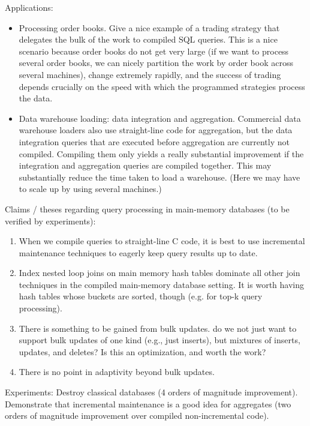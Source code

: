 \documentclass[10pt,twocolumn]{article}
\begin{document}
Applications:
\begin{itemize}
\item
Processing order books. Give a nice example of a trading strategy that
delegates the bulk of the work to compiled SQL queries.
This is a nice scenario because order books do not get very large (if we
want to process several order books, we can nicely partition the work by
order book across several machines), change extremely rapidly, and the
success of trading depends crucially on the speed with which the programmed
strategies process the data.

\item
Data warehouse loading: data integration and aggregation.
Commercial data warehouse loaders also use straight-line code for aggregation,
but the data integration queries that are executed before aggregation are currently not compiled. Compiling them only yields a really substantial improvement
if the integration and aggregation queries are compiled together. This may substantially reduce the time taken to load a warehouse. (Here we may have to scale up by using several machines.)
\end{itemize}

Claims / theses regarding query processing in main-memory databases (to be verified by experiments):
\begin{enumerate}
\item
When we compile queries to straight-line C code, it is best to use incremental
maintenance techniques to eagerly keep query results up to date.

\item
Index nested loop joins on main memory hash tables
dominate all other join techniques in the compiled
main-memory database setting.
It is worth having hash tables whose buckets are sorted, though (e.g. for
top-k query processing).

\item
There is something to be gained from bulk updates.
do we not just want to support bulk updates of one kind (e.g., just inserts),
but mixtures of inserts, updates, and deletes? Is this an optimization, and
worth the work?

\item
There is no point in adaptivity beyond bulk updates.
\end{enumerate}


Experiments:
Destroy classical databases (4 orders of magnitude improvement). Demonstrate
that incremental maintenance is a good idea for aggregates (two orders
of magnitude improvement over compiled non-incremental code).
\end{document}

